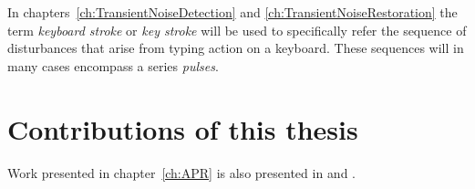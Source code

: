 In chapters~\ref{ch:TransientNoiseDetection} and \ref{ch:TransientNoiseRestoration} the term \emph{keyboard stroke} or \emph{key stroke} will be used to specifically refer the sequence of disturbances that arise from typing action on a keyboard. These sequences will in many cases encompass a series \emph{pulses}.


\section{Contributions of this thesis}
Work presented in chapter~\ref{ch:APR} is also presented in \cite{Christensen2011} and \cite{US20110316784}.

